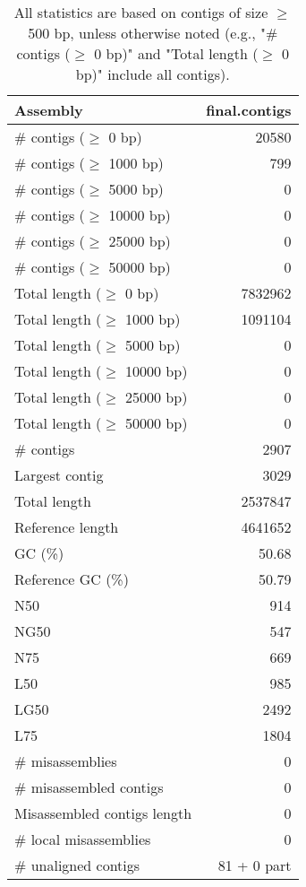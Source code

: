 \documentclass[12pt,a4paper]{article}
\begin{document}
\begin{table}[ht]
\begin{center}
\caption{All statistics are based on contigs of size $\geq$ 500 bp, unless otherwise noted (e.g., "\# contigs ($\geq$ 0 bp)" and "Total length ($\geq$ 0 bp)" include all contigs).}
\begin{tabular}{|l*{1}{|r}|}
\hline
Assembly & final.contigs \\ \hline
\# contigs ($\geq$ 0 bp) & 20580 \\ \hline
\# contigs ($\geq$ 1000 bp) & 799 \\ \hline
\# contigs ($\geq$ 5000 bp) & 0 \\ \hline
\# contigs ($\geq$ 10000 bp) & 0 \\ \hline
\# contigs ($\geq$ 25000 bp) & 0 \\ \hline
\# contigs ($\geq$ 50000 bp) & 0 \\ \hline
Total length ($\geq$ 0 bp) & 7832962 \\ \hline
Total length ($\geq$ 1000 bp) & 1091104 \\ \hline
Total length ($\geq$ 5000 bp) & 0 \\ \hline
Total length ($\geq$ 10000 bp) & 0 \\ \hline
Total length ($\geq$ 25000 bp) & 0 \\ \hline
Total length ($\geq$ 50000 bp) & 0 \\ \hline
\# contigs & 2907 \\ \hline
Largest contig & 3029 \\ \hline
Total length & 2537847 \\ \hline
Reference length & 4641652 \\ \hline
GC (\%) & 50.68 \\ \hline
Reference GC (\%) & 50.79 \\ \hline
N50 & 914 \\ \hline
NG50 & 547 \\ \hline
N75 & 669 \\ \hline
L50 & 985 \\ \hline
LG50 & 2492 \\ \hline
L75 & 1804 \\ \hline
\# misassemblies & 0 \\ \hline
\# misassembled contigs & 0 \\ \hline
Misassembled contigs length & 0 \\ \hline
\# local misassemblies & 0 \\ \hline
\# unaligned contigs & 81 + 0 part \\ \hline

\end{tabular}
\end{center}
\end{table}
\end{document}
